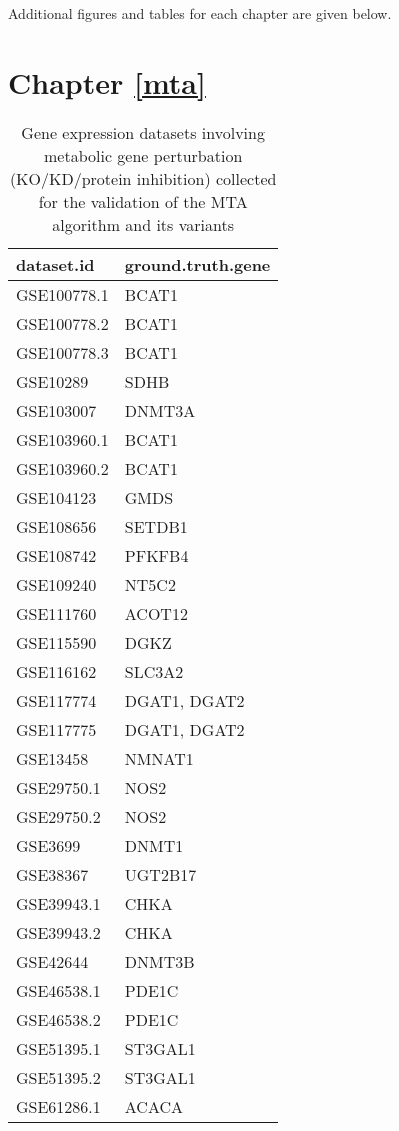 \documentclass[12pt,twoside,openany,\mydriver]{thesis}  %
\begin{document}
Additional figures and tables for each chapter are given below.

\hypertarget{chapter-refmta}{%
\section*{Chapter \ref{mta}}\label{chapter-refmta}}
\begin{longtable}[t]{ll}
\caption{\label{tab:mta-datasets}Gene expression datasets involving metabolic gene perturbation (KO/KD/protein inhibition) collected for the validation of the MTA algorithm and its variants}\\
\toprule
dataset.id & ground.truth.gene\\
\midrule
GSE100778.1 & BCAT1\\
GSE100778.2 & BCAT1\\
GSE100778.3 & BCAT1\\
GSE10289 & SDHB\\
GSE103007 & DNMT3A\\
\addlinespace
GSE103960.1 & BCAT1\\
GSE103960.2 & BCAT1\\
GSE104123 & GMDS\\
GSE108656 & SETDB1\\
GSE108742 & PFKFB4\\
\addlinespace
GSE109240 & NT5C2\\
GSE111760 & ACOT12\\
GSE115590 & DGKZ\\
GSE116162 & SLC3A2\\
GSE117774 & DGAT1, DGAT2\\
\addlinespace
GSE117775 & DGAT1, DGAT2\\
GSE13458 & NMNAT1\\
GSE29750.1 & NOS2\\
GSE29750.2 & NOS2\\
GSE3699 & DNMT1\\
\addlinespace
GSE38367 & UGT2B17\\
GSE39943.1 & CHKA\\
GSE39943.2 & CHKA\\
GSE42644 & DNMT3B\\
GSE46538.1 & PDE1C\\
\addlinespace
GSE46538.2 & PDE1C\\
GSE51395.1 & ST3GAL1\\
GSE51395.2 & ST3GAL1\\
GSE61286.1 & ACACA\\

\end{longtable}
\end{document}
